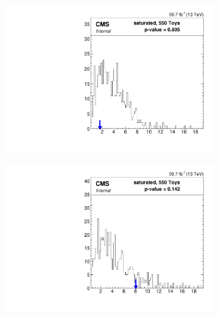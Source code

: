 \begin{figure}
    \begin{subfigure}[b]{0.5\linewidth}
        \centering
        \includegraphics[scale=0.35]{Chapitre7/Images/htt_mt_1_2018-saturated.pdf} 
        \caption{} 
        \vspace{0.5ex}
    \end{subfigure}
    \begin{subfigure}[b]{0.5\linewidth}
        \centering
        \includegraphics[scale=0.35]{Chapitre7/Images/htt_mt_2_2018-saturated.pdf} 
        \caption{} 
        \vspace{0.5ex}
    \end{subfigure}
    \begin{subfigure}[b]{0.5\linewidth}
        \centering

\end{subfigure}
\end{figure}
